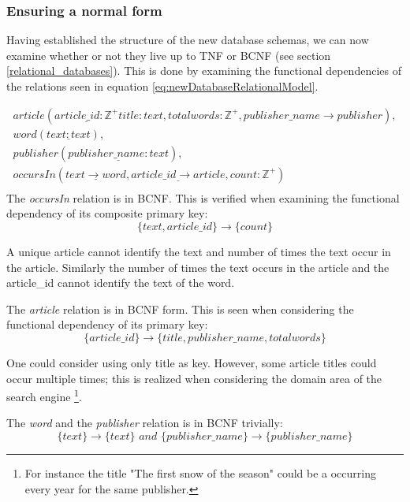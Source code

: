 \subsubsection*{Ensuring a normal form}
Having established the structure of the new database schemas, we can now examine whether or not they live up to TNF or BCNF (see section \ref{relational_databases}).
This is done by examining the functional dependencies of the relations seen in equation \ref{eq:newDatabaseRelationalModel}.

\begin{equation}\label{eq:newDatabaseRelationalModel}
    \begin{split}
        article(\underline{article\_id: \mathbb{Z}^+} title:text, totalwords:\mathbb{Z}^+, publisher\_name \rightarrow publisher), \\
        word(\underline{text:text}), \\
        publisher(\underline{publisher\_name:text}), \\
        occursIn(\underline{text \rightarrow word}, \underline{article\_id \rightarrow article}, count:\mathbb{Z}^+) \\
    \end{split}
\end{equation} 
The \textit{occursIn} relation is in BCNF. 
This is verified when examining the functional dependency of its composite primary key:
\begin{equation*}
 \{text,article\_id\}\rightarrow \{count\}   
\end{equation*}

A unique article cannot identify the text and number of times the text occur in the article.
Similarly the number of times the text occurs in the article and the article\_id cannot identify the text of the word.

The \textit{article} relation is in BCNF form. 
This is seen when considering the functional dependency of its primary key:
\begin{equation*}
    \{article\_id\} \rightarrow \{title, publisher\_name,totalwords\}
\end{equation*}

One could consider using only title as key. 
However, some article titles could occur multiple times; this is realized when considering the domain area of the \knox{} search engine
\footnote{For instance the title "The first snow of the season" could be a occurring every year for the same publisher.}.

The \textit{word} and the \textit{publisher} relation is in BCNF trivially:
\begin{equation*}
    \{ text\} \rightarrow \{text\} \textit{\ and\ } \{ publisher\_name \} \rightarrow \{ publisher\_name\}
\end{equation*}

